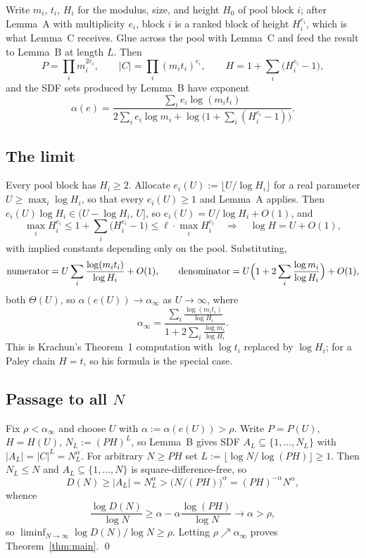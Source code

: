 \documentclass[11pt]{amsart}
\theoremstyle{plain}
\theoremstyle{remark}
\begin{document}
Write $m_i$, $t_i$, $H_i$ for the modulus, size, and height $H_0$ of pool
block $i$; after Lemma~A with multiplicity $e_i$, block $i$ is a ranked
block of height $H_i^{e_i}$, which is what Lemma~C receives. Glue across
the pool with Lemma~C and feed the result to Lemma~B at length $L$. Then
\[
P = \prod_i m_i^{2e_i}, \qquad
|C| = \prod_i (m_i t_i)^{e_i}, \qquad
H = 1 + \sum_i \bigl(H_i^{e_i} - 1\bigr),
\]
and the SDF sets produced by Lemma~B have exponent
\begin{equation}\label{eq:alphae}
\alpha(e) = \frac{\sum_i e_i \log(m_i t_i)}
{2 \sum_i e_i \log m_i + \log\bigl(1 + \sum_i (H_i^{e_i} - 1)\bigr)}.
\end{equation}

\subsection*{The limit}
Every pool block has $H_i \ge 2$. Allocate
$e_i(U) := \lfloor U / \log H_i \rfloor$ for a real parameter
$U \ge \max_i \log H_i$, so that every $e_i(U) \ge 1$ and Lemma~A applies.
Then $e_i(U) \log H_i \in (U - \log H_i,\, U]$, so
$e_i(U) = U/\log H_i + O(1)$, and
\[
\max_i H_i^{e_i} \le 1 + \sum_i \bigl(H_i^{e_i} - 1\bigr)
\le \ell \cdot \max_i H_i^{e_i}
\quad\Longrightarrow\quad \log H = U + O(1),
\]
with implied constants depending only on the pool. Substituting,
\[
\text{numerator} = U \sum_i \frac{\log(m_i t_i)}{\log H_i} + O(1),
\qquad
\text{denominator} = U \Bigl(1 + 2 \sum_i \frac{\log m_i}{\log H_i}\Bigr)
+ O(1),
\]
both $\Theta(U)$, so $\alpha(e(U)) \to \alpha_\infty$ as $U \to \infty$,
where
\begin{equation}\label{eq:alphainf}
\alpha_\infty
= \frac{\displaystyle \sum_i \frac{\log(m_i t_i)}{\log H_i}}
       {\displaystyle 1 + 2 \sum_i \frac{\log m_i}{\log H_i}}.
\end{equation}
This is Krachun's Theorem~1 computation with $\log t_i$ replaced by
$\log H_i$; for a Paley chain $H = t$, so his formula is the special case.

\subsection*{Passage to all \texorpdfstring{$N$}{N}}
Fix $\rho < \alpha_\infty$ and choose $U$ with
$\alpha := \alpha(e(U)) > \rho$. Write $P = P(U)$, $H = H(U)$,
$N_L := (PH)^L$, so Lemma~B gives SDF $A_L \subseteq \{1,\dots,N_L\}$ with
$|A_L| = |C|^L = N_L^\alpha$. For arbitrary $N \ge PH$ set
$L := \lfloor \log N / \log(PH) \rfloor \ge 1$. Then $N_L \le N$ and
$A_L \subseteq \{1,\dots,N\}$ is square-difference-free, so
\[
D(N) \ge |A_L| = N_L^\alpha > \bigl(N/(PH)\bigr)^\alpha
= (PH)^{-\alpha} N^\alpha,
\]
whence
\[
\frac{\log D(N)}{\log N} \ge \alpha - \alpha \frac{\log(PH)}{\log N}
\longrightarrow \alpha > \rho,
\]
so $\liminf_{N\to\infty} \log D(N)/\log N \ge \rho$. Letting
$\rho \nearrow \alpha_\infty$ proves Theorem~\ref{thm:main}. \qed
\end{document}
